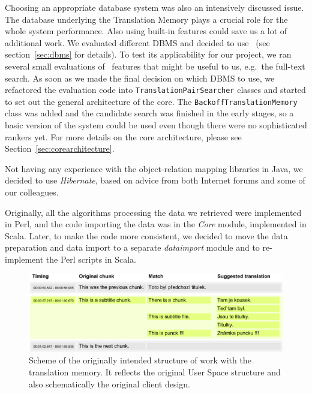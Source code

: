 Choosing an appropriate database system was also an intensively discussed issue. The database underlying the Translation Memory plays a crucial role for the whole system performance. Also using built-in features could save us a lot of additional work.
We evaluated different DBMS and decided to use \postgres~(see section~\ref{sec:dbms} for details). To test its applicability for our project, we ran several small evaluations of \postgres~features that might be useful to us, e.g.\ the full-text search. As soon as we made the final decision on which DBMS to use, we refactored the evaluation code into {\tt TranslationPairSearcher} classes and started to set out the general architecture of the core. The {\tt BackoffTranslationMemory} class was added and the candidate search was finished in the early stages, so a basic version of the system could be used even though there were no sophisticated rankers yet. For more details on the core architecture, please see Section~\ref{sec:corearchitecture}.

Not having any experience with the object-relation mapping libraries in Java, we decided to use {\it Hibernate}, based on advice from both Internet forums and some of our colleagues.

Originally, all the algorithms processing the data we retrieved were implemented in Perl, and the code importing the data was in the \emph{Core} module, implemented in Scala. Later, to make the code more consistent, we decided to move the data preparation and data import to a separate \emph{dataimport} module and to re-implement the Perl scripts in Scala.

\begin{figure}[h]
\begin{center}
\includegraphics{./figures/original_strucutre.pdf}
\end{center}

\caption{Scheme of the originally intended structure of work with the translation memory. It reflects the original User Space structure and also schematically the original client design.}\label{fig:original_scheme}

\end{figure}


